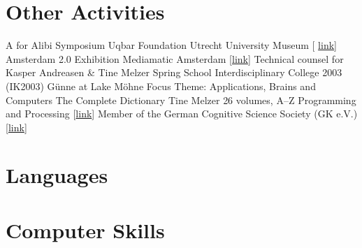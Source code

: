 \documentclass[10pt,a4paper,sans]{moderncv}
\begin{document}
\section{Other Activities}
        {A for Alibi Symposium}
        {}
        {Uqbar Foundation}
        {Utrecht University Museum [%
        \href{http://www.sternbergpress.com/?pageId=1204}{link}]}
        {}	
        {Amsterdam 2.0 Exhibition}
        {}
        {Mediamatic}
        {Amsterdam [\href{http://www.mediamatic.net/artefact-9850-en.html}%
        {link}]}
        {Technical counsel for Kasper Andreasen \& Tine Melzer}
        {Spring School}
        {}
        {Interdisciplinary College 2003 (IK2003)}
        {G\"{u}nne at Lake M\"{o}hne}
        {Focus Theme: Applications, Brains and Computers}
        {The Complete Dictionary}
        {}
        {Tine Melzer}
        {26 volumes, A--Z}
        {Programming and Processing
        [\href{http://www.tinemelzer.eu/works/the-complete-dictionary/}
        {link}]}
        {Member of the German Cognitive Science Society (GK e.V.)}
        {}
        {}
        {[\href{http://www.gk-ev.de}{link}]}
        {}


\section{Languages}


\section{Computer Skills}


\clearpage
\end{document}
